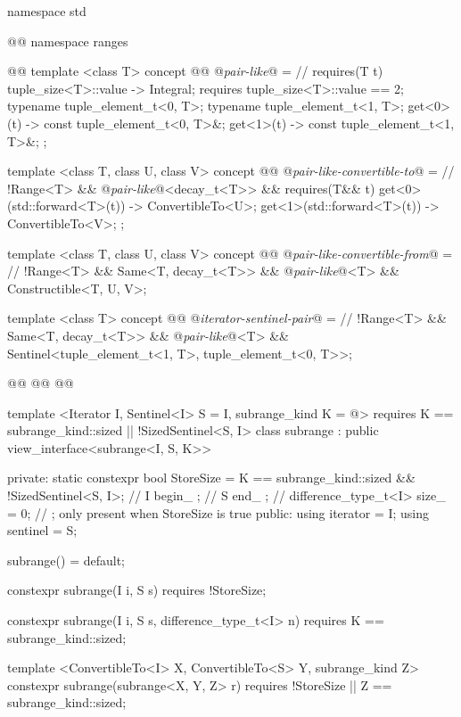 %
\begin{codeblock}
namespace std { @@ namespace ranges { @@
  template <class T>
  concept @@ @\textit{pair-like}@ = // \expos
    requires(T t) {
      { tuple_size<T>::value } -> Integral;
      requires tuple_size<T>::value == 2;
      typename tuple_element_t<0, T>;
      typename tuple_element_t<1, T>;
      { get<0>(t) } -> const tuple_element_t<0, T>&;
      { get<1>(t) } -> const tuple_element_t<1, T>&;
    };

  template <class T, class U, class V>
  concept @@ @\textit{pair-like-convertible-to}@ = // \expos
    !Range<T> && @\textit{pair-like}@<decay_t<T>> &&
    requires(T&& t) {
      { get<0>(std::forward<T>(t)) } -> ConvertibleTo<U>;
      { get<1>(std::forward<T>(t)) } -> ConvertibleTo<V>;
    };

  template <class T, class U, class V>
  concept @@ @\textit{pair-like-convertible-from}@ = // \expos
    !Range<T> && Same<T, decay_t<T>> && @\textit{pair-like}@<T> &&
    Constructible<T, U, V>;

  template <class T>
  concept @@ @\textit{iterator-sentinel-pair}@ = // \expos
    !Range<T> && Same<T, decay_t<T>> && @\textit{pair-like}@<T> &&
    Sentinel<tuple_element_t<1, T>, tuple_element_t<0, T>>;

  @@
  @@
    @@

  template <Iterator I, Sentinel<I> S = I, subrange_kind K = @\seebelow@>
    requires K == subrange_kind::sized || !SizedSentinel<S, I>
  class subrange : public view_interface<subrange<I, S, K>> {
  private:
    static constexpr bool StoreSize =
      K == subrange_kind::sized && !SizedSentinel<S, I>; // \expos
    I begin_ {}; // \expos
    S end_ {}; // \expos
    difference_type_t<I> size_ = 0; // \expos; only present when StoreSize is true
  public:
    using iterator = I;
    using sentinel = S;

    subrange() = default;

    constexpr subrange(I i, S s) requires !StoreSize;

    constexpr subrange(I i, S s, difference_type_t<I> n)
      requires K == subrange_kind::sized;

    template <ConvertibleTo<I> X, ConvertibleTo<S> Y, subrange_kind Z>
    constexpr subrange(subrange<X, Y, Z> r)
      requires !StoreSize || Z == subrange_kind::sized;

}}}
\end{codeblock}
